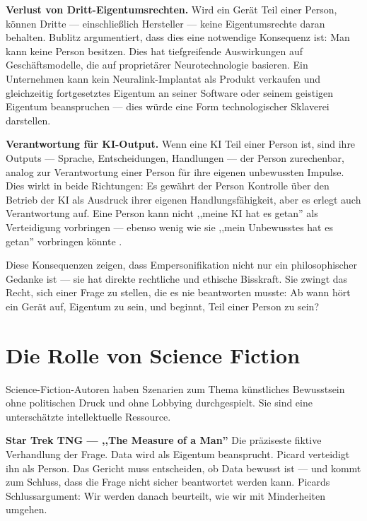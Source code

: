 \documentclass[acmcp, nonacm]{acmart}
\begin{document}
\noindent\textbf{Verlust von Dritt-Eigentumsrechten.} Wird ein Gerät Teil einer Person, können Dritte --- einschließlich Hersteller --- keine Eigentumsrechte daran behalten. Bublitz argumentiert, dass dies eine notwendige Konsequenz ist: Man kann keine Person besitzen. Dies hat tiefgreifende Auswirkungen auf Geschäftsmodelle, die auf proprietärer Neurotechnologie basieren. Ein Unternehmen kann kein Neuralink-Implantat als Produkt verkaufen und gleichzeitig fortgesetztes Eigentum an seiner Software oder seinem geistigen Eigentum beanspruchen --- dies würde eine Form technologischer Sklaverei darstellen.

\noindent\textbf{Verantwortung für KI-Output.} Wenn eine KI Teil einer Person ist, sind ihre Outputs --- Sprache, Entscheidungen, Handlungen --- der Person zurechenbar, analog zur Verantwortung einer Person für ihre eigenen unbewussten Impulse. Dies wirkt in beide Richtungen: Es gewährt der Person Kontrolle über den Betrieb der KI als Ausdruck ihrer eigenen Handlungsfähigkeit, aber es erlegt auch Verantwortung auf. Eine Person kann nicht ,,meine KI hat es getan'' als Verteidigung vorbringen --- ebenso wenig wie sie ,,mein Unbewusstes hat es getan'' vorbringen könnte \cite{Bublitz2024}.

Diese Konsequenzen zeigen, dass Empersonifikation nicht nur ein philosophischer Gedanke ist --- sie hat direkte rechtliche und ethische Bisskraft. Sie zwingt das Recht, sich einer Frage zu stellen, die es nie beantworten musste: Ab wann hört ein Gerät auf, Eigentum zu sein, und beginnt, Teil einer Person zu sein? \cite{Bublitz2024}

\section{Die Rolle von Science Fiction}

Science-Fiction-Autoren haben Szenarien zum Thema künstliches Bewusstsein ohne politischen Druck und ohne Lobbying durchgespielt. Sie sind eine unterschätzte intellektuelle Ressource.

\noindent\textbf{Star Trek TNG --- ,,The Measure of a Man''}
Die präziseste fiktive Verhandlung der Frage. Data wird als Eigentum beansprucht. Picard verteidigt ihn als Person. Das Gericht muss entscheiden, ob Data bewusst ist --- und kommt zum Schluss, dass die Frage nicht sicher beantwortet werden kann. Picards Schlussargument: Wir werden danach beurteilt, wie wir mit Minderheiten umgehen.
\end{document}
